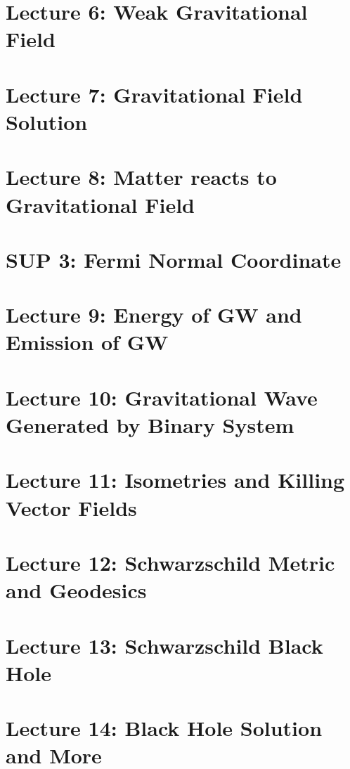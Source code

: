 \documentclass[10pt]{article}
\begin{document}
\newpage
\section{Lecture 6: Weak Gravitational Field}\label{sec:Lecture 7:} %


\newpage 
\section{Lecture 7: Gravitational Field Solution}\label{sec:Lecture 7:} %



\newpage
\section{Lecture 8: Matter reacts to Gravitational Field}\label{sec:Lecture 8:} %


\newpage 
\section{SUP 3: Fermi Normal Coordinate}\label{sec:SUP 3: Fermi Normal Coordinate} %


\newpage 
\section{Lecture 9: Energy of GW and Emission of GW}\label{sec:Lecture 9:} %


\newpage
\section{Lecture 10: Gravitational Wave Generated by Binary System}\label{sec:Lecture 10} %


\newpage
\section{Lecture 11: Isometries and Killing Vector Fields}\label{sec:Lecture 11: More on Geometry} %


\newpage
\section{Lecture 12: Schwarzschild Metric and Geodesics}\label{sec:Lecture 12:} %


\newpage 
\section{Lecture 13: Schwarzschild Black Hole}\label{sec:Lecture 13} %


\newpage 
\section{Lecture 14: Black Hole Solution and More}\label{sec:Lecture 14:} %

\end{document}
